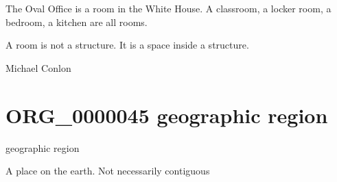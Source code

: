 \documentclass[letterpaper,10pt,english]{sphinxmanual}
\begin{document}
\begin{sphinxShadowBox}

\sphinxAtStartPar
The Oval Office is a room in the White House.  A classroom, a locker room, a bedroom, a kitchen are all rooms.
\end{sphinxShadowBox}

\begin{sphinxShadowBox}

\sphinxAtStartPar
A room is not a structure.  It is a space inside a structure.
\end{sphinxShadowBox}

\begin{sphinxShadowBox}

\sphinxAtStartPar
{}
\end{sphinxShadowBox}

\begin{sphinxShadowBox}

\sphinxAtStartPar
Michael Conlon 
\end{sphinxShadowBox}
\begin{quote}
\label{\detokenize{doc-ORG_0000045:org-0000045}}\label{\detokenize{doc-ORG_0000045:geographic-region}}\label{\detokenize{doc-ORG_0000045:org-0000045}}
\ignorespaces \end{quote}


\section{ORG\_0000045 \sphinxhyphen{} geographic region}
\label{\detokenize{doc-ORG_0000045:org-0000045-geographic-region}}\label{\detokenize{doc-ORG_0000045:index-0}}\label{\detokenize{doc-ORG_0000045::doc}}
\begin{sphinxShadowBox}

\sphinxAtStartPar
geographic region
\end{sphinxShadowBox}

\begin{sphinxShadowBox}

\sphinxAtStartPar
A place on the earth.  Not necessarily contiguous
\end{sphinxShadowBox}
\end{document}
